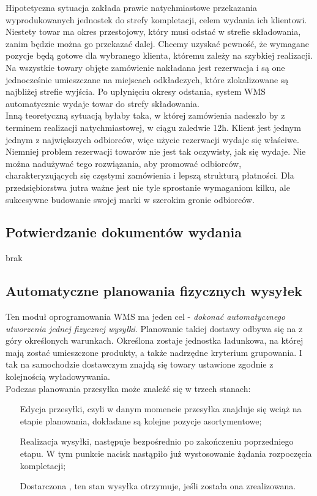 		Hipotetyczna sytuacja zakłada prawie natychmiastowe przekazania wyprodukowanych jednostek do strefy kompletacji,
		celem wydania ich klientowi. Niestety towar ma okres przestojowy, który musi odstać w strefie składowania, 
		zanim będzie można go przekazać dalej. Chcemy uzyskać pewność, że wymagane pozycje będą gotowe
		dla wybranego klienta, któremu zależy na szybkiej realizacji. Na wszystkie towary objęte zamówienie nakładana
		jest rezerwacja i są one jednocześnie umieszczane na miejscach odkładczych, które zlokalizowane są najbliżej
		strefie wyjścia. Po upłynięciu okresy odstania, system WMS automatycznie wydaje towar do strefy składowania.\\
		Inną teoretyczną sytuacją byłaby taka, w której zamówienia nadeszło by z terminem realizacji natychmiastowej, w ciągu
		zaledwie 12h. Klient jest jednym jednym z największych odbiorców, więc użycie rezerwacji wydaje się właściwe. \\
		
		Niemniej problem rezerwacji towarów nie jest tak oczywisty, jak się wydaje. Nie można nadużywać tego rozwiązania,
		aby promować odbiorców, charakteryzujących się częstymi zamówienia i lepszą strukturą płatności. Dla przedsiębiorstwa
		jutra ważne jest nie tyle sprostanie wymaganiom kilku, ale sukcesywne budowanie swojej marki w szerokim gronie
		odbiorców.  
	\subsection{Potwierdzanie dokumentów wydania}
		brak
	\subsection{Automatyczne planowania fizycznych wysyłek}
		Ten moduł oprogramowania WMS ma jeden cel - \emph{dokonać automatycznego utworzenia jednej fizycznej wysyłki}.
		Planowanie takiej dostawy odbywa się na z góry określonych warunkach. Określona zostaje jednostka ładunkowa, na
		której mają zostać umieszczone produkty, a także nadrzędne kryterium grupowania. I tak na samochodzie dostawczym
		znajdą się towary ustawione zgodnie z kolejnością wyładowywania. \\
		
		Podczas planowania przesyłka może znaleźć się w trzech stanach:
		\begin{enumerate}
			\item[Edycja] przesyłki, czyli w danym momencie przesyłka znajduje się wciąż na etapie planowania, dokładane
			są kolejne pozycje asortymentowe;
			\item[Realizacja] wysyłki, następuje bezpośrednio po zakończeniu poprzedniego etapu. W tym punkcie nacisk
			nastąpiło już wystosowanie żądania rozpoczęcia kompletacji;
			\item[Dostarczona], ten stan wysyłka otrzymuje, jeśli została ona zrealizowana.
		\end{enumerate}

